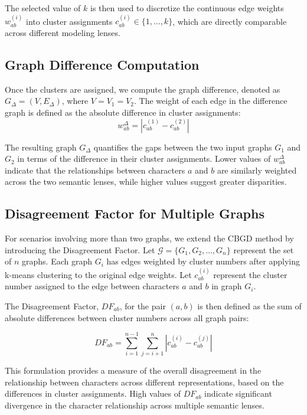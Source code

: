 \documentclass[a4paper,12pt]{report}
\begin{document}
The selected value of $k$ is then used to discretize the continuous edge weights $w_{ab}^{(i)}$ into cluster assignments $c_{ab}^{(i)} \in \{1, \dots, k\}$, which are directly comparable across different modeling lenses.
\
\subsection{Graph Difference Computation}

Once the clusters are assigned, we compute the graph difference, denoted as \( G_{\Delta} = (V, E_{\Delta}) \), where \( V = V_1 = V_2 \). The weight of each edge in the difference graph is defined as the absolute difference in cluster assignments:
\begin{equation}
    w_{ab}^{\Delta} = | c_{ab}^{(1)} - c_{ab}^{(2)} |
\end{equation}

The resulting graph \( G_{\Delta} \) quantifies the gaps between the two input graphs \( G_1 \) and \( G_2 \) in terms of the difference in their cluster assignments. Lower values of \( w_{ab}^{\Delta} \) indicate that the relationships between characters \( a \) and \( b \) are similarly weighted across the two semantic lenses, while higher values suggest greater disparities.

\subsection{Disagreement Factor for Multiple Graphs}

For scenarios involving more than two graphs, we extend the CBGD method by introducing the Disagreement Factor. Let $\mathcal{G} = \{G_1, G_2, \dots, G_n\}$ represent the set of $n$ graphs. Each graph $G_i$ has edges weighted by cluster numbers after applying k-means clustering to the original edge weights. Let $c_{ab}^{(i)}$ represent the cluster number assigned to the edge between characters $a$ and $b$ in graph $G_i$.

The Disagreement Factor, $DF_{ab}$, for the pair $(a,b)$ is then defined as the sum of absolute differences between cluster numbers across all graph pairs:

\[
DF_{ab} = \sum_{i=1}^{n-1} \sum_{j=i+1}^{n} |c_{ab}^{(i)} - c_{ab}^{(j)}|
\]

This formulation provides a measure of the overall disagreement in the relationship between characters across different representations, based on the differences in cluster assignments. High values of $DF_{ab}$ indicate significant divergence in the character relationship across multiple semantic lenses.
\end{document}
